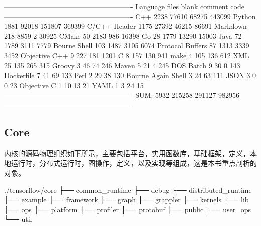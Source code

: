 \begin{content}
\begin{leftbar}
\begin{python}[caption={TensorFlow代码统计}]
-------------------------------------------------------
Language             files    blank    comment    code
-------------------------------------------------------
C++                   2238    77610     68275    443099
Python                1881    92018    151807    369399
C/C++ Header          1175    27392     46215     86691
Markdown               218     8859         2     30925
CMake                   50     2183       986     16398
Go                      28     1779     13290     15003
Java                    72     1789      3111      7779
Bourne Shell           103     1487      3105      6074
Protocol Buffers        87     1313      3339      3452
Objective C++            9      227       181      1201
C                        8      157       130       941
make                     4      105       136       612
XML                     25      135       265       315
Groovy                   3       46        74       246
Maven                    5       21         4       245
DOS Batch                9       30         0       143
Dockerfile               7       41        69       133
Perl                     2       29        38       130
Bourne Again Shell       3       24        63       111
JSON                     3        0         0        23
Objective C              1       10        13        21
YAML                     1        3        24        15
-------------------------------------------------------
SUM:                  5932   215258    291127    982956
-------------------------------------------------------
\end{python}
\end{leftbar}

\subsection{Core}

内核的源码物理组织如下所示，主要包括平台，实用函数库，基础框架，定义，本地运行时，分布式运行时，图操作，定义，以及实现等组成，这是本书重点剖析的对象。

\begin{leftbar}
\begin{c++}[caption={Core源码结构}]
./tensorflow/core
├── common_runtime
├── debug
├── distributed_runtime
├── example
├── framework
├── graph
├── grappler
├── kernels
├── lib
├── ops
├── platform
├── profiler
├── protobuf
├── public
├── user_ops
└── util
\end{c++}
\end{leftbar}


\end{content}
